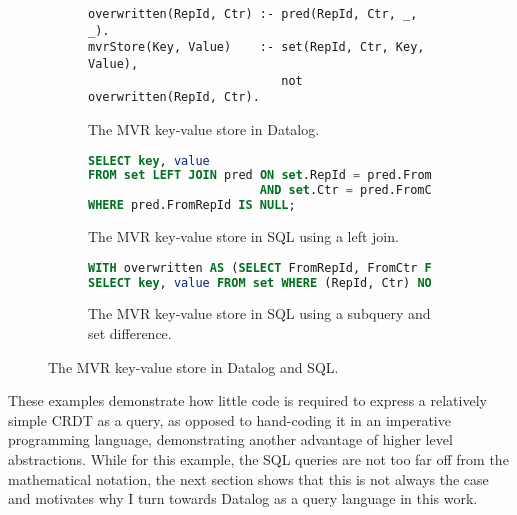 \begin{figure}[htpb]
	\centering

	\begin{subfigure}[b]{\textwidth}
		\begin{lstlisting}[keepspaces]
overwritten(RepId, Ctr) :- pred(RepId, Ctr, _, _).
mvrStore(Key, Value)    :- set(RepId, Ctr, Key, Value),
                           not overwritten(RepId, Ctr).\end{lstlisting}
		\caption{The \ac{MVR} key-value store in Datalog.}\label{code:mvr-store-datalog}
	\end{subfigure}

	\vspace{1em}

	\begin{subfigure}[b]{\textwidth}
		\begin{lstlisting}[language=SQL]
SELECT key, value
FROM set LEFT JOIN pred ON set.RepId = pred.FromRepId
                        AND set.Ctr = pred.FromCtr
WHERE pred.FromRepId IS NULL;
        \end{lstlisting}
		\caption{The \ac{MVR} key-value store in SQL using a left join.}\label{code:mvr-store-sql-left-join}
	\end{subfigure}

	\vspace{1em}

	\begin{subfigure}[b]{\textwidth}
		\begin{lstlisting}[language=SQL]
WITH overwritten AS (SELECT FromRepId, FromCtr FROM pred)
SELECT key, value FROM set WHERE (RepId, Ctr) NOT IN overwritten;
        \end{lstlisting}
		\caption{The \ac{MVR} key-value store in SQL using a subquery and set difference.}\label{code:mvr-store-sql-subquery}
	\end{subfigure}

	\caption{The \ac{MVR} key-value store in Datalog and SQL.}\label{code:mvr-store}
\end{figure}

These examples demonstrate how little code is required to express a relatively
simple \ac{CRDT} as a query, as opposed to hand-coding it in an imperative
programming language, demonstrating another advantage of higher level abstractions.
While for this example, the SQL queries are not too far off from the mathematical
notation, the next section shows that this is not always the case and motivates
why I turn towards Datalog as a query language in this work.


